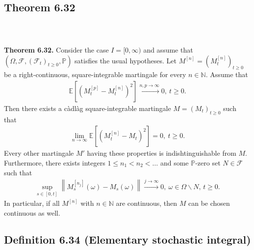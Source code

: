 \documentclass{beamer}
\numberwithin{equation}{section}
\newenvironment{frame2}{\begin{frame}\frametitle{{\normalsize \secname} \\ {\large \subsecname}}}{\end{frame}}
\begin{document}
\subsection{Theorem 6.32}

\begin{frame2}
    \begingroup
    \footnotesize
    \textbf{Theorem 6.32.}
    Consider the case $I = [0,\infty)$ and assume that $(\Omega, \mathcal{F}, (\mathcal{F}_t)_{t \geq 0},\mathbb{P})$ satisfies the usual hypotheses.
    Let $M^{[n]} = (M_t^{[n]})_{t\geq 0}$ be a right-continuous, square-integrable martingale for every $n \in \mathbb{N}$.
    Assume that
    \begin{align}
        \mathbb{E}\left[(M_t^{[p]} - M_t^{[n]})^2\right] \xrightarrow{n, p \to\infty} 0, \ t \geq 0.
    \end{align}
    Then there exists a càdlàg square-integrable martingale $M = \left(M_t\right)_{t \geq 0}$ such that
    \begin{align}
        \lim_{n \to \infty} \mathbb{E}\left[(M_t^{[n]} - M_t)^2\right] = 0, \ t \geq 0.
    \end{align}
    Every other martingale $M'$ having these properties is indishtinguishable from $M$.
    Furthermore, there exists integers $ 1 \leq n_1 < n_2 < \ldots$ and some $\mathbb{P}$-zero set $N\in \mathcal{F}$ such that
    \begin{align}
        \sup_{s \in [0,t]} \left\|M_s^{[n_j]}(\omega) - M_s(\omega) \right\| \xrightarrow{j \to \infty} 0, \ \omega \in \Omega\backslash N, \, t \geq 0.
    \end{align}
    In particular, if all $M^{[n]}$ with $n \in \mathbb{N}$ are continuous, then $M$ can be chosen continuous as well.
    \endgroup
\end{frame2}

\subsection{Definition 6.34 (Elementary stochastic integral)}
\end{document}
